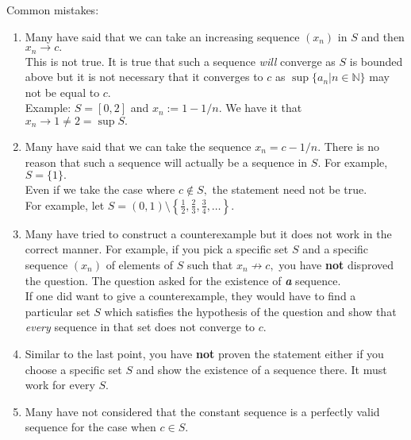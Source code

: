 \documentclass{article}
\begin{document}
Common mistakes:
\begin{enumerate} 
	\item Many have said that we can take an increasing sequence $(x_n)$ in $S$ and then $x_n \to c.$\\
	This is not true. It is true that such a sequence \emph{will} converge as $S$ is bounded above but it is not necessary that it converges to $c$ as $\sup\{a_n|n\in\mathbb{N}\}$ may not be equal to $c.$\\
	Example: $S = [0, 2]$ and $x_n := 1 - 1/n.$ We have it that $x_n \to 1 \neq 2 = \sup S.$
	\item Many have said that we can take the sequence $x_n = c - 1/n.$ There is no reason that such a sequence will actually be a sequence in $S.$ For example, $S = \{1\}.$\\
	Even if we take the case where $c \not\in S,$ the statement need not be true.\\
	For example, let $S = (0, 1)\setminus\left\{\frac{1}{2},\frac{2}{3},\frac{3}{4},\ldots\right\}.$
	\item Many have tried to construct a counterexample but it does not work in the correct manner. For example, if you pick a specific set $S$ and a specific sequence $(x_n)$ of elements of $S$ such that $x_n \not\to c,$ you have \textbf{not} disproved the question. The question asked for the existence of \emph{\textbf{a}} sequence.\\
	If one did want to give a counterexample, they would have to find a particular set $S$ which satisfies the hypothesis of the question and show that \emph{every} sequence in that set does not converge to $c.$
	\item Similar to the last point, you have \textbf{not} proven the statement either if you choose a specific set $S$ and show the existence of a sequence there. It must work for every $S.$ 
	\item Many have not considered that the constant sequence is a perfectly valid sequence for the case when $c \in S.$
\end{enumerate}
\end{document}
